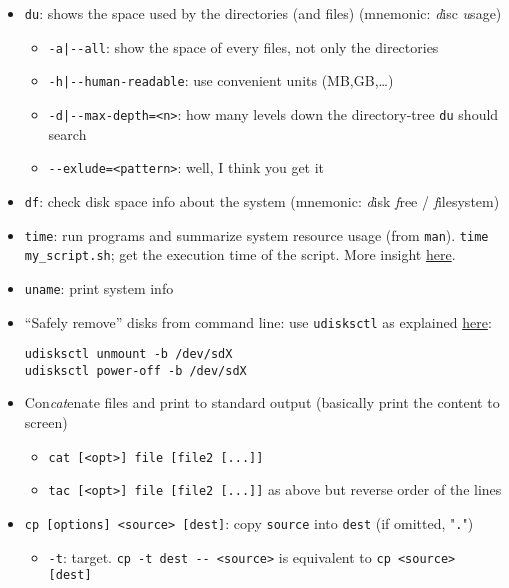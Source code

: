 \documentclass[a4paper,12pt,%
              final%
              ]{article}
\begin{document}
\begin{itemize}
\begin{itemize}
    \end{itemize}
  \item \texttt{du}: shows the space used by the directories (and files) (mnemonic: \emph{d}isc \emph{u}sage)
    \begin{itemize}
      \item \verb!-a|--all!: show the space of every files, not only the directories
      \item \verb!-h|--human-readable!: use convenient units (MB,GB,\ldots)
      \item \verb!-d|--max-depth=<n>!: how many levels down the directory-tree \texttt{du} should search
      \item \verb|--exlude=<pattern>|: well, I think you get it
    \end{itemize}
  \item \texttt{df}: check disk space info about the system (mnemonic: \emph{d}isk \emph{f}ree / \emph{f}ilesystem)
  \item \texttt{time}: run programs and summarize system resource usage (from \texttt{man}). \verb|time my_script.sh|; get the execution time of the script. More insight \href{https://stackoverflow.com/questions/556405/what-do-real-user-and-sys-mean-in-the-output-of-time1/556411#556411}{here}.
  \item \texttt{uname}: print system info
  \item ``Safely remove'' disks from command line: use \texttt{udisksctl} as explained \href{https://askubuntu.com/questions/532586/what-is-the-command-line-equivalent-of-safely-remove-drive}{here}:
\begin{verbatim}
udisksctl unmount -b /dev/sdX
udisksctl power-off -b /dev/sdX
\end{verbatim}
  \item Con\emph{cat}enate files and print to standard output (basically print the content to screen)
    \begin{itemize}
      \item \verb|cat [<opt>] file [file2 [...]]|
      \item \verb|tac [<opt>] file [file2 [...]]| as above but reverse order of the lines
    \end{itemize}
  \item \verb|cp [options] <source> [dest]|: copy \texttt{source} into \texttt{dest} (if omitted, "\texttt{.}")
    \begin{itemize}
      \item \verb|-t|: target. \verb|cp -t dest -- <source>| is equivalent to \verb|cp <source> [dest]|

\end{itemize}
\end{itemize}
\end{document}

